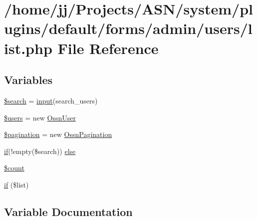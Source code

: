 \hypertarget{system_2plugins_2default_2forms_2admin_2users_2list_8php}{}\section{/home/jj/\+Projects/\+A\+S\+N/system/plugins/default/forms/admin/users/list.php File Reference}
\label{system_2plugins_2default_2forms_2admin_2users_2list_8php}
\subsection*{Variables}
\begin{DoxyCompactItemize}
\item 
\hyperlink{system_2plugins_2default_2forms_2admin_2users_2list_8php_ae549977dd05a017aa81372f6994bf955}{\$search} = \hyperlink{ossn_8lib_8input_8php_a64ebee98b041c4f75f71ed3cd73cc8ed}{input}(\textquotesingle{}search\+\_\+users\textquotesingle{})
\item 
\hyperlink{system_2plugins_2default_2forms_2admin_2users_2list_8php_a28005d22fa7ef2dfe215ad886b497d9c}{\$users} = new \hyperlink{class_ossn_user}{Ossn\+User}
\item 
\hyperlink{system_2plugins_2default_2forms_2admin_2users_2list_8php_a388a4a950e936f746d3b9c1b56450ce7}{\$pagination} = new \hyperlink{class_ossn_pagination}{Ossn\+Pagination}
\item 
\hyperlink{jquery_8tokeninput_8js_ad8dd46a3cbc004569e34401e9e71771a}{if}(!empty(\$search)) \hyperlink{system_2plugins_2default_2forms_2admin_2users_2list_8php_a74597e8a4487f29d116665e0437a6ced}{else}
\item 
\hyperlink{system_2plugins_2default_2forms_2admin_2users_2list_8php_af789423037bbc89dc7c850e761177570}{\$count}
\item 
\hyperlink{system_2plugins_2default_2forms_2admin_2users_2list_8php_ad5b470d0a25b1bac17fbfa5e12e14b74}{if} (\$list)
\end{DoxyCompactItemize}


\subsection{Variable Documentation}
